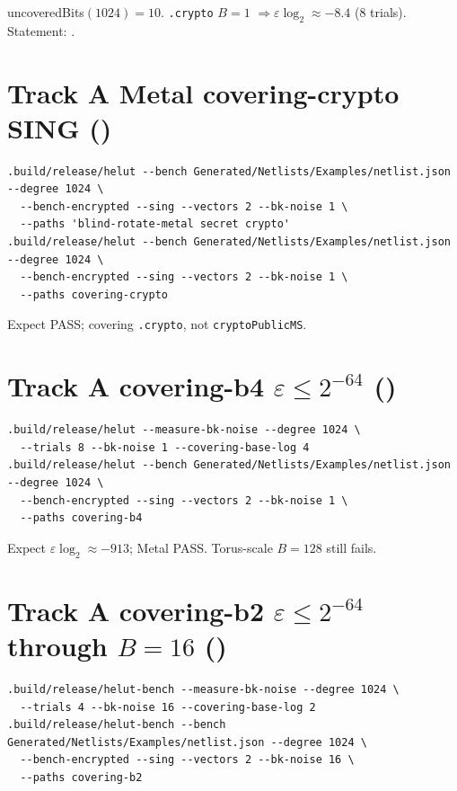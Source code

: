 uncoveredBits$(1024)=10$. \texttt{.crypto} $B{=}1$ $\Rightarrow\varepsilon\log_2\approx-8.4$ (8 trials).
Statement: .

\section{Track A Metal covering-crypto SING ()}

\begin{lstlisting}
.build/release/helut --bench Generated/Netlists/Examples/netlist.json --degree 1024 \
  --bench-encrypted --sing --vectors 2 --bk-noise 1 \
  --paths 'blind-rotate-metal secret crypto'
.build/release/helut --bench Generated/Netlists/Examples/netlist.json --degree 1024 \
  --bench-encrypted --sing --vectors 2 --bk-noise 1 \
  --paths covering-crypto
\end{lstlisting}

Expect PASS; covering \texttt{.crypto}, not \texttt{cryptoPublicMS}.

\section{Track A covering-b4 $\varepsilon\le 2^{-64}$ ()}

\begin{lstlisting}
.build/release/helut --measure-bk-noise --degree 1024 \
  --trials 8 --bk-noise 1 --covering-base-log 4
.build/release/helut --bench Generated/Netlists/Examples/netlist.json --degree 1024 \
  --bench-encrypted --sing --vectors 2 --bk-noise 1 \
  --paths covering-b4
\end{lstlisting}

Expect $\varepsilon\log_2\approx-913$; Metal PASS. Torus-scale $B{=}128$ still fails.

\section{Track A covering-b2 $\varepsilon\le 2^{-64}$ through $B{=}16$ (\cid{35})}

\begin{lstlisting}
.build/release/helut-bench --measure-bk-noise --degree 1024 \
  --trials 4 --bk-noise 16 --covering-base-log 2
.build/release/helut-bench --bench Generated/Netlists/Examples/netlist.json --degree 1024 \
  --bench-encrypted --sing --vectors 2 --bk-noise 16 \
  --paths covering-b2
\end{lstlisting}

